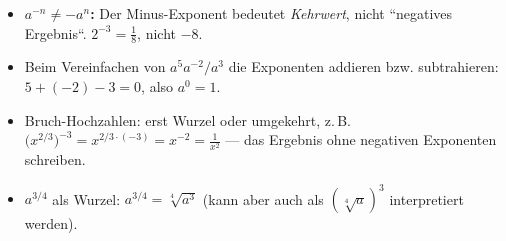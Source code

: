 \begin{achtung}
\begin{itemize}
  \item \textbf{$a^{-n}\neq -a^n$:} Der Minus-Exponent bedeutet
        \emph{Kehrwert}, nicht ``negatives Ergebnis``. $2^{-3}=\tfrac18$,
        nicht $-8$.
  \item Beim Vereinfachen von $a^5 a^{-2}/a^3$ die Exponenten addieren
        bzw. subtrahieren: $5+(-2)-3=0$, also $a^0=1$.
  \item Bruch-Hochzahlen: erst Wurzel oder umgekehrt, z.\,B.
        $\bigl(x^{2/3}\bigr)^{-3}=x^{2/3\cdot(-3)}=x^{-2}=\tfrac1{x^2}$ ---
        das Ergebnis ohne negativen Exponenten schreiben.
  \item $a^{3/4}$ als Wurzel: $a^{3/4}=\sqrt[4]{a^3}$ (kann aber auch
        als $(\sqrt[4]{a})^3$ interpretiert werden).
\end{itemize}
\end{achtung}
